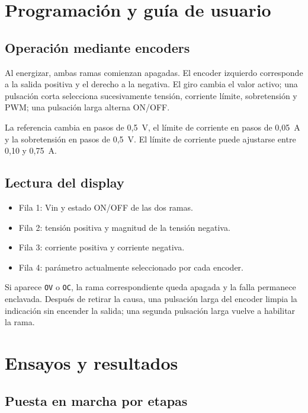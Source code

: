 \documentclass[conference]{IEEEtran}
\begin{document}
\section{Programación y guía de usuario}

\subsection{Operación mediante encoders}

Al energizar, ambas ramas comienzan apagadas. El encoder izquierdo corresponde a la salida positiva y el derecho a la negativa. El giro cambia el valor activo; una pulsación corta selecciona sucesivamente tensión, corriente límite, sobretensión y PWM; una pulsación larga alterna ON/OFF.

La referencia cambia en pasos de 0,5~V, el límite de corriente en pasos de 0,05~A y la sobretensión en pasos de 0,5~V. El límite de corriente puede ajustarse entre 0,10 y 0,75~A.

\subsection{Lectura del display}

\begin{itemize}
\item Fila 1: Vin y estado ON/OFF de las dos ramas.
\item Fila 2: tensión positiva y magnitud de la tensión negativa.
\item Fila 3: corriente positiva y corriente negativa.
\item Fila 4: parámetro actualmente seleccionado por cada encoder.
\end{itemize}

Si aparece \texttt{OV} o \texttt{OC}, la rama correspondiente queda apagada y la falla permanece enclavada. Después de retirar la causa, una pulsación larga del encoder limpia la indicación sin encender la salida; una segunda pulsación larga vuelve a habilitar la rama.

\section{Ensayos y resultados}

\subsection{Puesta en marcha por etapas}
\end{document}
